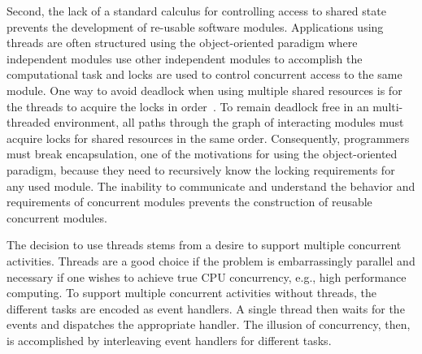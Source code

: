 Second, the lack of a standard calculus for controlling access to shared state prevents the development of re-usable software modules.
Applications using threads are often structured using the object-oriented paradigm where independent modules use other independent modules to accomplish the computational task and locks are used to control concurrent access to the same module.
One way to avoid deadlock when using multiple shared resources is for the threads to acquire the locks in order~\cite{lee_cites_this}.
To remain deadlock free in an multi-threaded environment, all paths through the graph of interacting modules must acquire locks for shared resources in the same order.
Consequently, programmers must break encapsulation, one of the motivations for using the object-oriented paradigm, because they need to recursively know the locking requirements for any used module.
The inability to communicate and understand the behavior and requirements of concurrent modules prevents the construction of reusable concurrent modules.

The decision to use threads stems from a desire to support multiple concurrent activities.
Threads are a good choice if the problem is embarrassingly parallel and necessary if one wishes to achieve true CPU concurrency, e.g., high performance computing.
To support multiple concurrent activities without threads, the different tasks are encoded as event handlers.
A single thread then waits for the events and dispatches the appropriate handler.
The illusion of concurrency, then, is accomplished by interleaving event handlers for different tasks.

